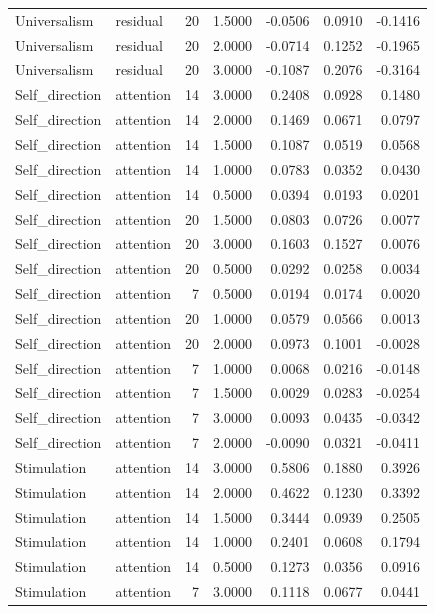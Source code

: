 \begin{tabular}{llrrrrr}
Universalism & residual & 20 & 1.5000 & -0.0506 & 0.0910 & -0.1416 \\
Universalism & residual & 20 & 2.0000 & -0.0714 & 0.1252 & -0.1965 \\
Universalism & residual & 20 & 3.0000 & -0.1087 & 0.2076 & -0.3164 \\
Self\_direction & attention & 14 & 3.0000 & 0.2408 & 0.0928 & 0.1480 \\
Self\_direction & attention & 14 & 2.0000 & 0.1469 & 0.0671 & 0.0797 \\
Self\_direction & attention & 14 & 1.5000 & 0.1087 & 0.0519 & 0.0568 \\
Self\_direction & attention & 14 & 1.0000 & 0.0783 & 0.0352 & 0.0430 \\
Self\_direction & attention & 14 & 0.5000 & 0.0394 & 0.0193 & 0.0201 \\
Self\_direction & attention & 20 & 1.5000 & 0.0803 & 0.0726 & 0.0077 \\
Self\_direction & attention & 20 & 3.0000 & 0.1603 & 0.1527 & 0.0076 \\
Self\_direction & attention & 20 & 0.5000 & 0.0292 & 0.0258 & 0.0034 \\
Self\_direction & attention & 7 & 0.5000 & 0.0194 & 0.0174 & 0.0020 \\
Self\_direction & attention & 20 & 1.0000 & 0.0579 & 0.0566 & 0.0013 \\
Self\_direction & attention & 20 & 2.0000 & 0.0973 & 0.1001 & -0.0028 \\
Self\_direction & attention & 7 & 1.0000 & 0.0068 & 0.0216 & -0.0148 \\
Self\_direction & attention & 7 & 1.5000 & 0.0029 & 0.0283 & -0.0254 \\
Self\_direction & attention & 7 & 3.0000 & 0.0093 & 0.0435 & -0.0342 \\
Self\_direction & attention & 7 & 2.0000 & -0.0090 & 0.0321 & -0.0411 \\
Stimulation & attention & 14 & 3.0000 & 0.5806 & 0.1880 & 0.3926 \\
Stimulation & attention & 14 & 2.0000 & 0.4622 & 0.1230 & 0.3392 \\
Stimulation & attention & 14 & 1.5000 & 0.3444 & 0.0939 & 0.2505 \\
Stimulation & attention & 14 & 1.0000 & 0.2401 & 0.0608 & 0.1794 \\
Stimulation & attention & 14 & 0.5000 & 0.1273 & 0.0356 & 0.0916 \\
Stimulation & attention & 7 & 3.0000 & 0.1118 & 0.0677 & 0.0441 \\

\end{tabular}
